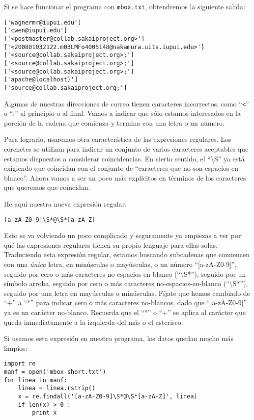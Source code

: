 Si se hace funcionar el programa con {\tt mbox.txt}, obtendremos la siguiente salida:

\beforeverb
\begin{verbatim}
['wagnermr@iupui.edu']
['cwen@iupui.edu']
['<postmaster@collab.sakaiproject.org>']
['<200801032122.m03LMFo4005148@nakamura.uits.iupui.edu>']
['<source@collab.sakaiproject.org>;']
['<source@collab.sakaiproject.org>;']
['<source@collab.sakaiproject.org>;']
['apache@localhost)']
['source@collab.sakaiproject.org;']
\end{verbatim}
\afterverb
%
Algunas de nuestras direcciones de correo tienen caracteres incorrectos, como  ``\verb"<"'' o ``;'' al principio
o al final. Vamos a indicar que sólo estamos interesados en la porción de la cadena que comienza y
termina con una letra o un número.

Para lograrlo, usaremos otra característica de las expresiones regulares. Los corchetes se utilizan para indicar
un conjunto de varios caracteres aceptables que estamos dispuestos a considerar coincidencias. En cierto sentido,
el ``{\textbackslash}S'' ya está exigiendo que coincidan con el conjunto de ``caracteres que no son espacios en
blanco''. Ahora vamos a ser un poco más explícitos en términos de los caracteres que queremos que coincidan.

He aquí nuestra nueva expresión regular:

\beforeverb
\begin{verbatim}
[a-zA-Z0-9]\S*@\S*[a-zA-Z]
\end{verbatim}
\afterverb
%
Esto se va volviendo un poco complicado y seguramente ya empiezas a ver por qué las expresiones regulares tienen
su propio lenguaje para ellas solas. Traduciendo esta expresión regular, estamos buscando subcadenas que
comiencen con una {\em única} letra, en minúsculas o mayúsculas, o un número ``[a-zA-Z0-9]'', seguido por cero
o más caracteres no-espacios-en-blanco (``{\textbackslash}S*''), seguido por un símbolo arroba, seguido por cero
o más caracteres no-espacios-en-blanco (``{\textbackslash}S*''), seguido por una letra en mayúsculas o minúsculas.
Fíjate que hemos cambiado de ``+'' a ``*'' para indicar cero o más caracteres no-blancos, dado que ``[a-zA-Z0-9]''
ya es un carácter no-blanco. Recuerda que el ``*'' o ``+'' se aplica al carácter que queda inmediatamente
a la izquierda del más o el asterisco.

Si usamos esta expresión en nuestro programa, los datos quedan mucho más limpios:

\beforeverb
\begin{verbatim}
import re
manf = open('mbox-short.txt')
for linea in manf:
    linea = linea.rstrip()
    x = re.findall('[a-zA-Z0-9]\S*@\S*[a-zA-Z]', linea)
    if len(x) > 0 :
        print x
\end{verbatim}
\afterverb
%

